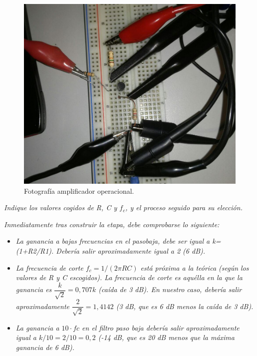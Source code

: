 \documentclass[paper=a4, fontsize=11pt]{scrartcl} %
\numberwithin{equation}{section} %
\numberwithin{figure}{section} %
\numberwithin{table}{section} %
\begin{document}
\begin{figure}[h]
	\centering
	\includegraphics[scale=0.4]{image/ampli-victor}
	\caption{Fotografía amplificador operacional.} \label{foto3a}
\end{figure}

\newpage

\textit{Indique los valores cogidos de R, C y $f_{c}$, y el proceso seguido para su elección.} \newline

\textit{Inmediatamente tras construir la etapa, debe comprobarse lo siguiente:}

\begin{itemize}
	\item \textit{La ganancia a bajas frecuencias en el pasobaja, debe ser igual a k=(1+R2/R1). Debería salir aproximadamente igual a 2 (6 dB).}
	\item \textit{La frecuencia de corte $ f_{c}=1/(2 \pi RC) $ está próxima a la teórica (según los valores de R y C escogidos). La frecuencia de corte es aquélla en la que la ganancia es $ \dfrac{k}{\sqrt{2}} =0,707k $ (caída de 3 dB). En nuestro caso, debería salir aproximadamente $ \dfrac{2}{\sqrt{2}}=1,4142 $ (3 dB, que es 6 dB menos la caída de 3 dB).}
	\item \textit{La ganancia a $ 10·fc $ en el filtro paso baja debería salir aproximadamente igual a $ k/10=2/10=0,2 $ (-14 dB, que es 20 dB menos que la máxima ganancia de 6 dB).}
\end{itemize} 
\end{document}
